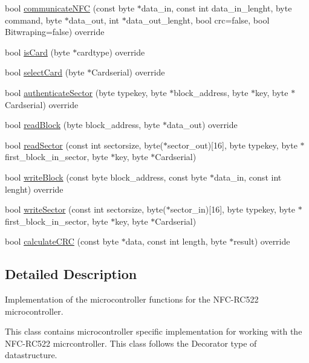 \begin{DoxyCompactItemize}
\item 
bool \hyperlink{class_r_c522_aa8ec37f7914b3aa1e3866dda7e08063f}{communicate\+N\+FC} (const byte $\ast$data\+\_\+in, const int data\+\_\+in\+\_\+lenght, byte command, byte $\ast$data\+\_\+out, int $\ast$data\+\_\+out\+\_\+lenght, bool crc=false, bool Bitwraping=false) override
\item 
bool \hyperlink{class_r_c522_a6cef2c82c923eeed59bd3cb5e7a42090}{is\+Card} (byte $\ast$cardtype) override
\item 
bool \hyperlink{class_r_c522_a2b41c31a04a41b6098945b0fddcf1476}{select\+Card} (byte $\ast$Cardserial) override
\item 
bool \hyperlink{class_r_c522_a84000801a44a02cf59601400b809f5a3}{authenticate\+Sector} (byte typekey, byte $\ast$block\+\_\+address, byte $\ast$key, byte $\ast$Cardserial) override
\item 
bool \hyperlink{class_r_c522_a4a9843ee47bd24f6446bb8c327411076}{read\+Block} (byte block\+\_\+address, byte $\ast$data\+\_\+out) override
\item 
bool \hyperlink{class_r_c522_a6c6409ef5f4385e9d1efac5b2f9caed0}{read\+Sector} (const int sectorsize, byte($\ast$sector\+\_\+out)\mbox{[}16\mbox{]}, byte typekey, byte $\ast$first\+\_\+block\+\_\+in\+\_\+sector, byte $\ast$key, byte $\ast$Cardserial)
\item 
bool \hyperlink{class_r_c522_a42c197d61571667a97176f7294b0a8dd}{write\+Block} (const byte block\+\_\+address, const byte $\ast$data\+\_\+in, const int lenght) override
\item 
bool \hyperlink{class_r_c522_a11e060e686331017873edd877c3255cd}{write\+Sector} (const int sectorsize, byte($\ast$sector\+\_\+in)\mbox{[}16\mbox{]}, byte typekey, byte $\ast$first\+\_\+block\+\_\+in\+\_\+sector, byte $\ast$key, byte $\ast$Cardserial)
\item 
bool \hyperlink{class_r_c522_a851317030e6ad460210c136fd8f961fa}{calculate\+C\+RC} (const byte $\ast$data, const int length, byte $\ast$result) override
\end{DoxyCompactItemize}


\subsection{Detailed Description}
Implementation of the microcontroller functions for the N\+F\+C-\/\+R\+C522 microcontroller.

This class contains microcontroller specific implementation for working with the N\+F\+C-\/\+R\+C522 micrcontroller. This class follows the Decorator type of datastructure. 

